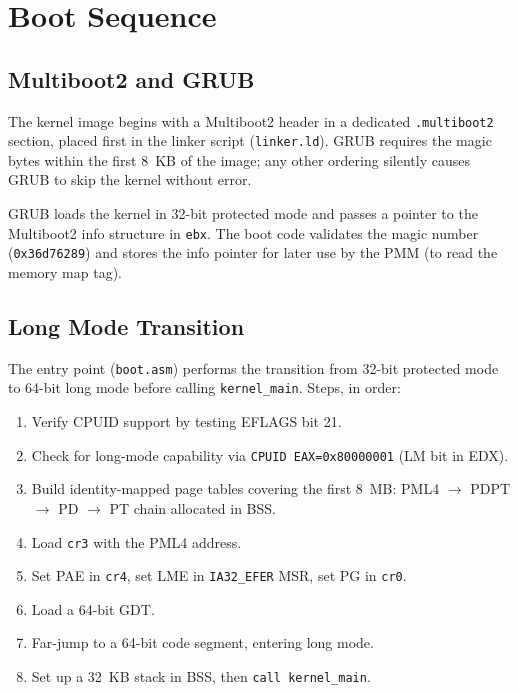 \documentclass[12pt,a4paper]{article}
\begin{document}
\section{Boot Sequence}

\subsection{Multiboot2 and GRUB}

The kernel image begins with a Multiboot2 header in a dedicated \texttt{.multiboot2} section, placed first in the linker script (\texttt{linker.ld}). GRUB requires the magic bytes within the first 8~KB of the image; any other ordering silently causes GRUB to skip the kernel without error.

GRUB loads the kernel in 32-bit protected mode and passes a pointer to the Multiboot2 info structure in \texttt{ebx}. The boot code validates the magic number (\texttt{0x36d76289}) and stores the info pointer for later use by the PMM (to read the memory map tag).

\subsection{Long Mode Transition}

The entry point (\texttt{boot.asm}) performs the transition from 32-bit protected mode to 64-bit long mode before calling \texttt{kernel\_main}. Steps, in order:

\begin{enumerate}
    \item Verify CPUID support by testing EFLAGS bit 21.
    \item Check for long-mode capability via \texttt{CPUID EAX=0x80000001} (LM bit in EDX).
    \item Build identity-mapped page tables covering the first 8~MB: PML4 $\to$ PDPT $\to$ PD $\to$ PT chain allocated in BSS.
    \item Load \texttt{cr3} with the PML4 address.
    \item Set PAE in \texttt{cr4}, set LME in \texttt{IA32\_EFER} MSR, set PG in \texttt{cr0}.
    \item Load a 64-bit GDT.
    \item Far-jump to a 64-bit code segment, entering long mode.
    \item Set up a 32~KB stack in BSS, then \texttt{call kernel\_main}.
\end{enumerate}
\end{document}
